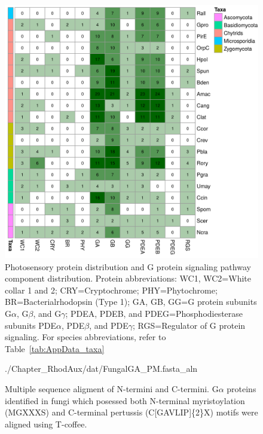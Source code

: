 
\begin{figure}[hb]
  \centering
  \includegraphics[]{./Chapter_RhodAux/img/photosenseHeatmap.png}
  \caption[Photosensory survey]{Photosensory protein distribution and G protein signaling pathway component distribution. Protein abbreviations: WC1, WC2=White collar 1 and 2; CRY=Cryptochrome; PHY=Phytochrome; BR=Bacterialrhodopsin (Type 1); GA, GB, GG=G protein subunits G$\alpha$, G$\beta$, and G$\gamma$; PDEA, PDEB, and PDEG=Phosphodiesterase subunits PDE$\alpha$, PDE$\beta$, and PDE$\gamma$; RGS=Regulator of G protein signaling. For species abbreviations, refer to Table~\ref{tab:AppData_taxa}}
  \label{fig:ChRhodA_photosenseSurvey}
\end{figure}

\begin{figure}[hb]
  \centering
  \begin{texshade}{./Chapter_RhodAux/dat/FungalGA_PM.fasta_aln}
    \hidenumbering
  \end{texshade}
  \caption[G$\alpha$ MSA]{Multiple sequence aligment of N-termini and C-termini. G$\alpha$ proteins identified in fungi which posessed both N-terminal myristoylation (MGXXXS) and C-terminal pertussis (C[GAVLIP]\{2\}X) motifs were aligned using T-coffee.}
  \label{fig:ChRhodA_gaMSA}
\end{figure}

